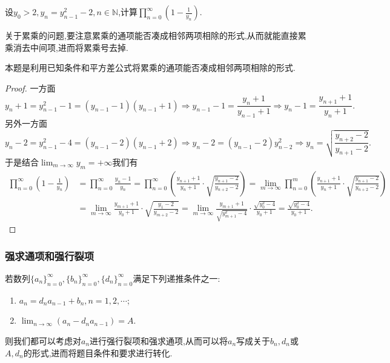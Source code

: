 \documentclass[lang=cn,newtx,10pt,scheme=chinese]{elegantbook}
\begin{document}
\begin{example}
   设\(y_0>2,y_n=y_{n - 1}^{2}-2,n\in\mathbb{N}\),计算\(\prod_{n = 0}^{\infty}(1 - \frac{1}{y_n})\).  
\end{example}
\begin{note}
   关于累乘的问题,要注意累乘的通项能否凑成相邻两项相除的形式,从而就能直接累乘消去中间项,进而将累乘号去掉.
   
   本题是利用已知条件和平方差公式将累乘的通项能否凑成相邻两项相除的形式.
\end{note}
\begin{proof}
   一方面
   \[
   y_n + 1=y_{n - 1}^{2}-1=(y_{n - 1}-1)(y_{n - 1}+1)\Rightarrow y_{n - 1}-1=\frac{y_n + 1}{y_{n - 1}+1}\Rightarrow y_n - 1=\frac{y_{n + 1}+1}{y_n + 1}.
   \]
   另外一方面
   \[
   y_n - 2=y_{n - 1}^{2}-4=(y_{n - 1}-2)(y_{n - 1}+2)\Rightarrow y_n - 2=(y_{n - 1}-2)y_{n - 2}^{2}\Rightarrow y_n=\sqrt{\frac{y_{n + 2}-2}{y_{n + 1}-2}}.
   \]
   于是结合\(\lim_{m\rightarrow\infty}y_m = +\infty\)我们有
   \begin{align*}
   \prod_{n = 0}^{\infty}\left(1-\frac{1}{y_n}\right)&=\prod_{n=0}^{\infty}{\frac{y_n-1}{y_n}}=\prod_{n = 0}^{\infty}\left(\frac{y_{n + 1}+1}{y_n + 1}\cdot\sqrt{\frac{y_{n + 1}-2}{y_{n + 2}-2}}\right)
   =\lim_{m\rightarrow\infty}\prod_{n = 0}^{m}\left(\frac{y_{n + 1}+1}{y_n + 1}\cdot\sqrt{\frac{y_{n + 1}-2}{y_{n + 2}-2}}\right)\\
   &=\lim_{m\rightarrow\infty}\frac{y_{m + 1}+1}{y_0 + 1}\cdot\sqrt{\frac{y_1 - 2}{y_{m + 2}-2}}
   =\lim_{m\rightarrow\infty}\frac{y_{m + 1}+1}{\sqrt{y_{m + 1}^{2}-4}}\cdot\frac{\sqrt{y_0^{2}-4}}{y_0 + 1}
   =\frac{\sqrt{y_0^{2}-4}}{y_0 + 1}.
   \end{align*}
\end{proof}

\subsubsection{强求通项和强行裂项}

若数列\(\{ a_n \}_{n = 0}^{\infty}, \{ b_n \}_{n = 0}^{\infty}, \{ d_n \}_{n = 0}^{\infty}\)满足下列递推条件之一:
\begin{enumerate}
    \item \(a_n = d_na_{n - 1} + b_n, n = 1, 2, \cdots\);
    \item \(\lim_{n\rightarrow \infty}(a_n - d_na_{n - 1}) = A\).
\end{enumerate}
则我们都可以考虑对\(a_n\)进行强行裂项和强求通项,从而可以将\(a_n\)写成关于\(b_n, d_n\)或\(A, d_n\)的形式,进而将题目条件和要求进行转化.
\end{document}
